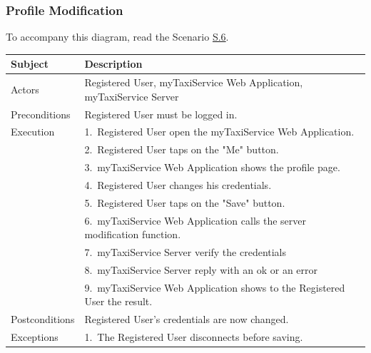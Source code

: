 \subsubsection{Profile Modification}
			To accompany this diagram, read the Scenario \hyperref[sec:RegisteredUserProfileModificationScenario]{S.6}.

				\begin{table}[htpb]
					\centering
					\label{tab:RegisteredUserProfileModificationDiagramTable}
					\begin{tabularx}{\textwidth}{lp{9cm}}
						\hline
						\hline
							\textbf{Subject}
						& 
							\textbf{Description}\\
						\hline
							Actors	       &  Registered User, myTaxiService Web Application, myTaxiService Server\\
						\hline
							Preconditions  &  Registered User must be logged in.\\
						\hline
							Execution      &  1.~Registered User open the myTaxiService Web Application.\\
										   &  2.~Registered User taps on the "Me" button.\\
										   &  3.~myTaxiService Web Application shows the profile page.\\
										   &  4.~Registered User changes his credentials.\\
										   &  5.~Registered User taps on the "Save" button.\\
										   &  6.~myTaxiService Web Application calls the server modification function.\\
										   &  7.~myTaxiService Server verify the credentials\\
										   &  8.~myTaxiService Server reply with an ok or an error\\
										   &  9.~myTaxiService Web Application shows to the Registered User the result.\\
						\hline
							Postconditions &  Registered User's credentials are now changed.\\
						\hline
							Exceptions     &  1.~The Registered User disconnects before saving.\\
									
						\hline
						\hline
					\end{tabularx}
				\end{table}
				
